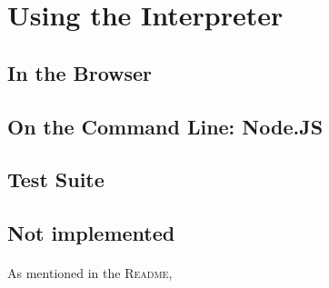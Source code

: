 \documentclass{article}
\begin{document}
\section{Using the Interpreter}

\subsection{In the Browser}

\subsection{On the Command Line: Node.JS}

\subsection{Test Suite}

\subsection{Not implemented}

\paragraph{}
As mentioned in the \textsc{Readme},


%
%

\end{document}
